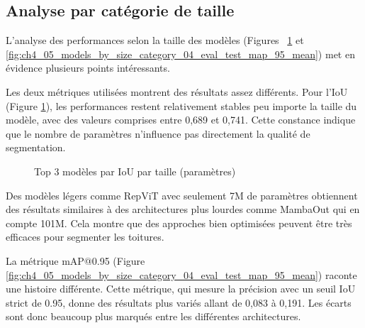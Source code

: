 \subsection{Analyse par catégorie de taille}

L'analyse des performances selon la taille des modèles (Figures ~\ref{fig:ch4_05_models_by_size_category_01_eval_test_iou_mean} et \ref{fig:ch4_05_models_by_size_category_04_eval_test_map_95_mean}) met en évidence plusieurs points intéressants.

Les deux métriques utilisées montrent des résultats assez différents. Pour l'IoU (Figure \ref{fig:ch4_05_models_by_size_category_01_eval_test_iou_mean}), les performances restent relativement stables peu importe la taille du modèle, avec des valeurs comprises entre 0,689 et 0,741. Cette constance indique que le nombre de paramètres n'influence pas directement la qualité de segmentation.

\begin{figure}[H]
    \centering
    \caption{Top 3 modèles par IoU par taille (paramètres)}
    \label{fig:ch4_05_models_by_size_category_01_eval_test_iou_mean}
\end{figure}

Des modèles légers comme RepViT avec seulement 7M de paramètres obtiennent des résultats similaires à des architectures plus lourdes comme MambaOut qui en compte 101M. Cela montre que des approches bien optimisées peuvent être très efficaces pour segmenter les toitures.

La métrique mAP@0.95 (Figure \ref{fig:ch4_05_models_by_size_category_04_eval_test_map_95_mean}) raconte une histoire différente. Cette métrique, qui mesure la précision avec un seuil IoU strict de 0.95, donne des résultats plus variés allant de 0,083 à 0,191. Les écarts sont donc beaucoup plus marqués entre les différentes architectures.

